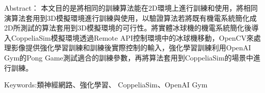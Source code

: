 \begin{flushleft}
\timesbi Abstract：\sectionef 
本文目的是將相同的訓練算法能在2D環境上進行訓練和使用，將相同演算法套用到3D模擬環境進行訓練與使用，以驗證算法若將既有機電系統簡化成2D所測試的算法套用到3D模擬環境的可行性。將實體冰球機的機電系統簡化後導入CoppeliaSim模擬環境透過Remote API控制環境中的冰球機移動，OpenCV來處理影像提供強化學習訓練和訓練後實際控制的輸入，強化學習訓練利用OpenAI Gym的Pong Game測試適合的訓練參數，再將算法套用到CoppeliaSim的場景中進行訓練。\\%
\end{flushleft}
\begin{flushleft}
\timesbi Keywords:\sectionef 類神經網路、強化學習、 CoppeliaSim、OpenAI Gym
\end{flushleft}
\vspace{1pt}